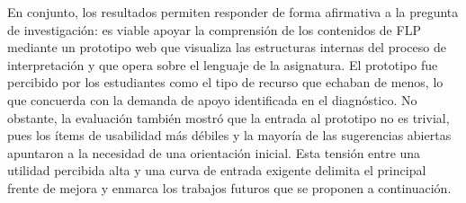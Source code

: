 En conjunto, los resultados permiten responder de forma afirmativa a la pregunta de investigación: es viable apoyar la comprensión de los contenidos de FLP mediante un prototipo web que visualiza las estructuras internas del proceso de interpretación y que opera sobre el lenguaje de la asignatura. El prototipo fue percibido por los estudiantes como el tipo de recurso que echaban de menos, lo que concuerda con la demanda de apoyo identificada en el diagnóstico. No obstante, la evaluación también mostró que la entrada al prototipo no es trivial, pues los ítems de usabilidad más débiles y la mayoría de las sugerencias abiertas apuntaron a la necesidad de una orientación inicial. Esta tensión entre una utilidad percibida alta y una curva de entrada exigente delimita el principal frente de mejora y enmarca los trabajos futuros que se proponen a continuación.
